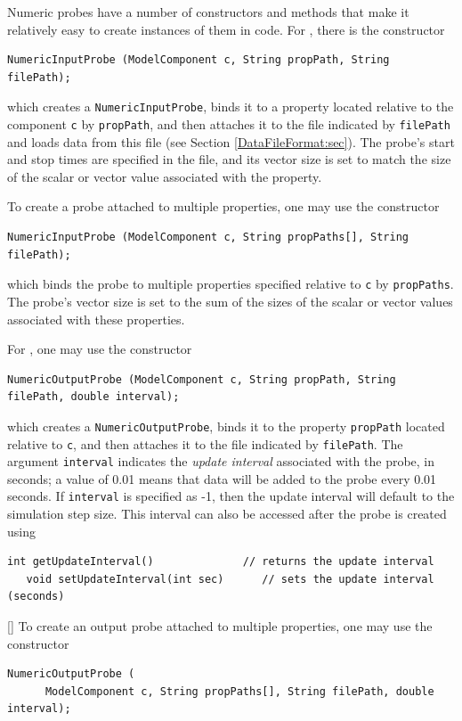 Numeric probes have a number of constructors and methods that make it
relatively easy to create instances of them in code. For 
, there
is the constructor
\begin{lstlisting}[]
   NumericInputProbe (ModelComponent c, String propPath, String filePath);
\end{lstlisting}
%
which creates a {\tt NumericInputProbe}, binds it to a property
located relative to the component {\tt c} by {\tt propPath}, and then
attaches it to the file indicated by {\tt filePath} and loads data
from this file (see Section \ref{DataFileFormat:sec}). The probe's start and
stop times are specified in the file, and its vector size is
set to match the size of the scalar or vector value associated with
the property.

To create a probe attached to multiple properties, one may use the
constructor
\begin{lstlisting}[]
   NumericInputProbe (ModelComponent c, String propPaths[], String filePath);
\end{lstlisting}
%
which binds the probe to multiple properties specified relative to
{\tt c} by {\tt propPaths}. The probe's vector size is set to
the sum of the sizes of the scalar or vector values associated with
these properties.

For , one may use
the constructor
\begin{lstlisting}[]
   NumericOutputProbe (ModelComponent c, String propPath, String filePath, double interval);
\end{lstlisting}
%
which creates a {\tt NumericOutputProbe}, binds it to the property
{\tt propPath} located relative to {\tt c}, and then attaches it to
the file indicated by {\tt filePath}. The argument {\tt interval}
indicates the {\it update interval} associated with the probe, in seconds;
a value of 0.01 means that data will be added to the probe every 0.01
seconds.  If {\tt interval} is specified as -1, then the update interval
will default to the simulation step size. This interval can
also be accessed after the probe is created using
\begin{lstlisting}[]
   int getUpdateInterval()              // returns the update interval
   void setUpdateInterval(int sec)      // sets the update interval (seconds)
\end{lstlisting}[]
%
To create an output probe attached to multiple properties, one may use the
constructor
\begin{lstlisting}[]
   NumericOutputProbe (
      ModelComponent c, String propPaths[], String filePath, double interval);
\end{lstlisting}
%

